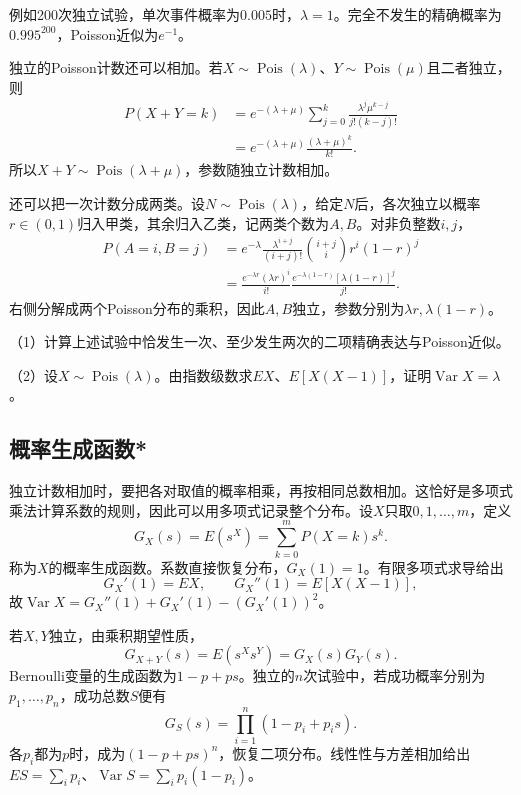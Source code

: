 例如200次独立试验，单次事件概率为\(0.005\)时，\(\lambda=1\)。完全不发生的精确概率为\(0.995^{200}\)，Poisson近似为\(e^{-1}\)。

独立的Poisson计数还可以相加。若\(X\sim\operatorname{Pois}(\lambda)\)、\(Y\sim\operatorname{Pois}(\mu)\)且二者独立，则
\begin{align*}
 P(X+Y=k)&=e^{-(\lambda+\mu)}\sum_{j=0}^k
 \frac{\lambda^j\mu^{k-j}}{j!(k-j)!}\\
 &=e^{-(\lambda+\mu)}\frac{(\lambda+\mu)^k}{k!}.
\end{align*}
所以\(X+Y\sim\operatorname{Pois}(\lambda+\mu)\)，参数随独立计数相加。

还可以把一次计数分成两类。设\(N\sim\operatorname{Pois}(\lambda)\)，给定\(N\)后，各次独立以概率\(r\in(0,1)\)归入甲类，其余归入乙类，记两类个数为\(A,B\)。对非负整数\(i,j\)，
\begin{align*}
 P(A=i,B=j)
 &=e^{-\lambda}\frac{\lambda^{i+j}}{(i+j)!}\binom{i+j}i r^i(1-r)^j\\
 &=\frac{e^{-\lambda r}(\lambda r)^i}{i!}
  \frac{e^{-\lambda(1-r)}[\lambda(1-r)]^j}{j!}.
\end{align*}
右侧分解成两个Poisson分布的乘积，因此\(A,B\)独立，参数分别为\(\lambda r,\lambda(1-r)\)。

\begin{exercise}
\mbox{}\par\nobreak

（1）计算上述试验中恰发生一次、至少发生两次的二项精确表达与Poisson近似。

（2）设\(X\sim\operatorname{Pois}(\lambda)\)。由指数级数求\(EX\)、\(E[X(X-1)]\)，证明\(\operatorname{Var}X=\lambda\)。
\end{exercise}

\newpage
\subsection{概率生成函数*}

独立计数相加时，要把各对取值的概率相乘，再按相同总数相加。这恰好是多项式乘法计算系数的规则，因此可以用多项式记录整个分布。设\(X\)只取\(0,1,\ldots,m\)，定义
\begin{equation}\label{eq:prob-pgf}
 G_X(s)=E(s^X)=\sum_{k=0}^mP(X=k)s^k.
\end{equation}
称为\(X\)的{\heiti 概率生成函数}。系数直接恢复分布，\(G_X(1)=1\)。有限多项式求导给出
\[
 G_X'(1)=EX,\qquad G_X''(1)=E[X(X-1)],
\]
故\(\operatorname{Var}X=G_X''(1)+G_X'(1)-(G_X'(1))^2\)。

若\(X,Y\)独立，由乘积期望性质，
\[
 G_{X+Y}(s)=E(s^Xs^Y)=G_X(s)G_Y(s).
\]
Bernoulli变量的生成函数为\(1-p+ps\)。独立的\(n\)次试验中，若成功概率分别为\(p_1,\ldots,p_n\)，成功总数\(S\)便有
\[
 G_S(s)=\prod_{i=1}^n(1-p_i+p_is).
\]
各\(p_i\)都为\(p\)时，成为\((1-p+ps)^n\)，恢复二项分布。线性性与方差相加给出\(ES=\sum_i p_i\)、\(\operatorname{Var}S=\sum_i p_i(1-p_i)\)。

